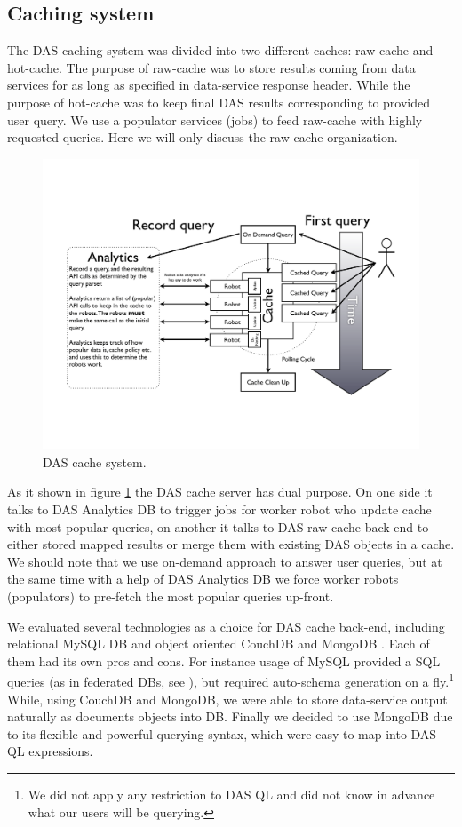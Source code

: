 \documentclass[a4paper]{jpconf}
\begin{document}
\subsection{Caching system}
The DAS caching system was divided into two different caches: raw-cache and hot-cache.
The purpose of raw-cache was to store results coming from data services for
as long as specified in data-service response header. While the purpose of hot-cache
was to keep final DAS results corresponding to provided user query. We use a populator
services (jobs) to feed raw-cache with highly requested queries. Here we will only
discuss the raw-cache organization. 
\begin{figure}[htb]
\centering
\includegraphics[width=150mm]{DAS_Cache_and_Analytics.pdf}
\caption{
DAS cache system.
}
\label{DAS_cache}
\end{figure}
As it shown in figure \ref{DAS_cache} the DAS cache server has dual purpose.
On one side it talks to DAS Analytics DB to trigger jobs for worker robot
who update cache with most popular queries, on another it talks to DAS
raw-cache back-end to either stored mapped results or merge them with 
existing DAS objects in a cache. We should note that we use on-demand
approach to answer user queries, but at the same time with a help of
DAS Analytics DB we force worker robots (populators) to pre-fetch
the most popular queries up-front.

We evaluated several technologies
as a choice for DAS cache back-end, including relational MySQL DB \cite{MySQL} 
and object oriented CouchDB \cite{CouchDB} and MongoDB \cite{MongoDB}.
Each of them had its own pros and cons. For instance usage
of MySQL provided a SQL queries (as in federated DBs, see \cite{FedDB}), but
required auto-schema generation on a fly.\footnote{We did not apply any
restriction to DAS QL and did not know in advance what our users will be
querying.} While, using CouchDB and MongoDB, we were able to store
data-service output naturally as documents objects into DB. Finally we decided
to use MongoDB due to its flexible and
powerful querying syntax, which were easy to map into DAS QL expressions. 
\end{document}
